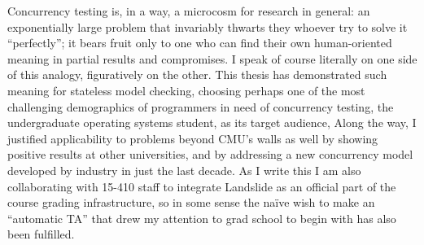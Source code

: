 \documentclass[12pt]{cmuthesis}
\begin{document}
Concurrency testing is, in a way, a microcosm for research in general:
an exponentially large problem
that invariably thwarts they whoever try to solve it ``perfectly'';
it bears fruit only to one who can find their own human-oriented meaning in partial results and compromises.
I speak of course literally on one side of this analogy, figuratively on the other.
This thesis has demonstrated such meaning for stateless model checking,
choosing perhaps one of the most challenging demographics of programmers in need of concurrency testing,
the undergraduate operating systems student,
as its target audience,
Along the way, I justified  applicability to problems beyond CMU's walls as well
by showing positive results at other universities,
and by addressing a new concurrency model developed by  industry in just the last decade.
As I write this I am also collaborating with 15-410 staff
to integrate Landslide as an official part of the course grading infrastructure,
so in some sense the na\"{i}ve wish to make an ``automatic TA'' that drew my attention to grad school to begin with
has also been fulfilled.
\end{document}
